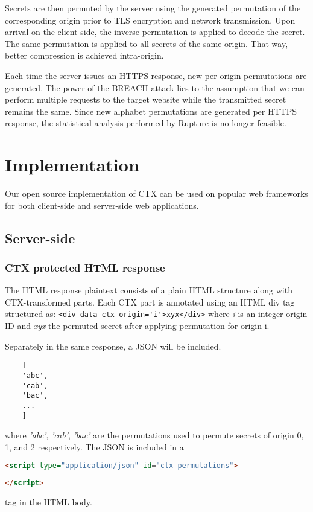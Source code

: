 \documentclass[a4paper, 11 pt, conference]{article}  %
\begin{document}
Secrets are then permuted by the server using the generated permutation of the
corresponding origin prior to TLS encryption and network transmission. Upon
arrival on the client side, the inverse permutation is applied to decode the
secret. The same permutation is applied to all secrets of the same origin. That
way, better compression is achieved intra-origin.

Each time the server issues an HTTPS response, new per-origin permutations are
generated. The power of the BREACH attack lies to the assumption that we can perform
multiple requests to the target website while the transmitted secret remains the same. Since new alphabet permutations are generated per HTTPS response, the statistical analysis performed by Rupture is no longer feasible.

\section{Implementation}

Our open source implementation of CTX can be used on popular web frameworks for both client-side and server-side web applications.

\subsection{Server-side}

\subsubsection{CTX protected HTML response}
The HTML response plaintext consists of a plain HTML structure along with CTX-transformed parts. Each CTX part is annotated using an HTML div tag structured as:
\lstinline{<div data-ctx-origin='i'>xyx</div>}
where \textit{i} is an integer origin ID and \textit{xyx} the permuted secret after applying permutation for origin i.

Separately in the same response, a JSON will be included.

\begin{lstlisting}
    [
    'abc',
    'cab',
    'bac',
    ...
    ]
\end{lstlisting}

where \textit{'abc'}, \textit{'cab'}, \textit{'bac'} are the permutations used to permute secrets of origin 0, 1, and 2 respectively. The JSON is included in a
\begin{lstlisting}[language=HTML]
<script type="application/json" id="ctx-permutations">
\end{lstlisting}
\begin{lstlisting}[language=HTML]
</script>
\end{lstlisting} tag in the HTML body.
\end{document}
